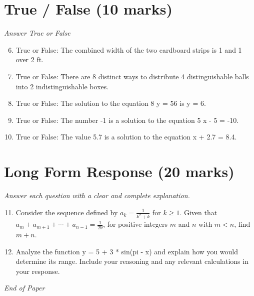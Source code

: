 \documentclass[12pt]{article}
\begin{document}
\section*{True / False (10 marks)}
\textit{Answer True or False}
\begin{enumerate}[label=\arabic*.]
\setcounter{enumi}{5}
\item True or False: The combined width of the two cardboard strips is 1 and 1 over 2 ft.
\item True or False: There are 8 distinct ways to distribute 4 distinguishable balls into 2 indistinguishable boxes.
\item True or False: The solution to the equation 8 y = 56 is y = 6.
\item True or False: The number -1 is a solution to the equation 5 x - 5 = -10.
\item True or False: The value 5.7 is a solution to the equation x + 2.7 = 8.4.
\end{enumerate}

\section*{Long Form Response (20 marks)}
\textit{Answer each question with a clear and complete explanation.}
\begin{enumerate}[label=\arabic*.]
\setcounter{enumi}{10}
\item Consider the sequence defined by $a_k=\frac 1{k^2+k}$ for $k\ge 1$. Given that $a_m+a_{m+1}+\cdots+a_{n-1}=\frac{1}{29}$, for positive integers $m$ and $n$ with $m<n$, find $m+n$.
\item Analyze the function y = 5 + 3 * sin(pi - x) and explain how you would determine its range. Include your reasoning and any relevant calculations in your response.
\end{enumerate}

\vfill
\noindent\textit{End of Paper}
\end{document}
